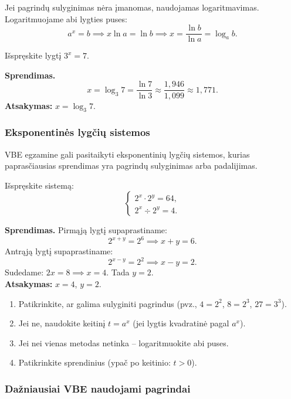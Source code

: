 Jei pagrindų sulyginimas nėra įmanomas, naudojamas logaritmavimas. Logaritmuojame
abi lygties puses:
\[
    a^x = b \implies x \ln a = \ln b \implies x = \frac{\ln b}{\ln a} = \log_a b.
\]

\begin{example}
Išspręskite lygtį $3^x = 7$.

\textbf{Sprendimas.}
\[
    x = \log_3 7 = \frac{\ln 7}{\ln 3} \approx \frac{1{,}946}{1{,}099} \approx 1{,}771.
\]
\textbf{Atsakymas:} $x = \log_3 7$.
\end{example}

\subsubsection*{Eksponentinės lygčių sistemos}

VBE egzamine gali pasitaikyti eksponentinių lygčių sistemos, kurias paprasčiausias sprendimas
yra pagrindų sulyginimas arba padalijimas.

\begin{example}
Išspręskite sistemą:
\[
    \begin{cases}
        2^x \cdot 2^y = 64, \\
        2^x \div 2^y = 4.
    \end{cases}
\]

\textbf{Sprendimas.} Pirmąją lygtį supaprastiname:
\[
    2^{x+y} = 2^6 \implies x + y = 6.
\]
Antrąją lygtį supaprastiname:
\[
    2^{x-y} = 2^2 \implies x - y = 2.
\]
Sudedame: $2x = 8 \implies x = 4$. Tada $y = 2$.\\
\textbf{Atsakymas:} $x = 4$, $y = 2$.
\end{example}

\begin{tcolorbox}[title={Eksponentinių lygčių sprendimo algoritmas}]
\begin{enumerate}
    \item Patikrinkite, ar galima sulyginiti pagrindus (pvz., $4 = 2^2$, $8 = 2^3$, $27 = 3^3$).
    \item Jei ne, naudokite keitinį $t = a^x$ (jei lygtis kvadratinė pagal $a^x$).
    \item Jei nei vienas metodas netinka – logaritmuokite abi puses.
    \item Patikrinkite sprendinius (ypač po keitinio: $t > 0$).
\end{enumerate}
\end{tcolorbox}

\subsubsection*{Dažniausiai VBE naudojami pagrindai}

